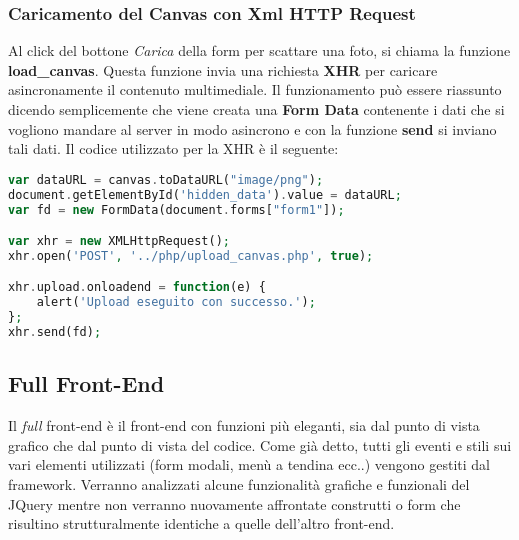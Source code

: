 \subsubsection{Caricamento del Canvas con Xml HTTP Request}
Al click del bottone \textit{Carica} della form per scattare una foto, si chiama la funzione \textbf{load\_canvas}.
Questa funzione invia una richiesta \textbf{XHR} per caricare asincronamente il contenuto multimediale. Il funzionamento può essere riassunto dicendo semplicemente che viene creata una \textbf{Form Data} contenente i dati che si vogliono mandare al server in modo asincrono e con la funzione \textbf{send} si inviano tali dati.
\newline Il codice utilizzato per la XHR è il seguente:
\begin{lstlisting}[language=PHP]
var dataURL = canvas.toDataURL("image/png");
document.getElementById('hidden_data').value = dataURL;
var fd = new FormData(document.forms["form1"]);

var xhr = new XMLHttpRequest();
xhr.open('POST', '../php/upload_canvas.php', true);

xhr.upload.onloadend = function(e) {
	alert('Upload eseguito con successo.');
};
xhr.send(fd);
\end{lstlisting}

\newpage
\subsection{Full Front-End}

Il \textit{full} front-end è il front-end con funzioni più eleganti, sia dal punto di vista grafico che dal punto di vista del codice. \newline Come già detto, tutti gli eventi e stili sui vari elementi utilizzati (form modali, menù a tendina ecc..) vengono gestiti dal framework. Verranno analizzati alcune funzionalità grafiche e funzionali del JQuery mentre non verranno nuovamente affrontate construtti o form che risultino strutturalmente identiche a quelle dell'altro front-end.
